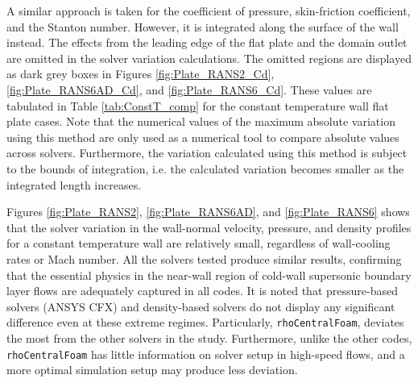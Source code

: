 \documentclass[journal ]{new-aiaa}
\begin{document}
A similar approach is taken for the coefficient of pressure, skin-friction coefficient, and the Stanton number. However, it is integrated along the surface of the wall instead. The effects from the leading edge of the flat plate and the domain outlet are omitted in the solver variation calculations. The omitted regions are displayed as dark grey boxes in Figures \ref{fig:Plate_RANS2_Cd},  \ref{fig:Plate_RANS6AD_Cd}, and \ref{fig:Plate_RANS6_Cd}. These values are tabulated in Table \ref{tab:ConstT_comp} for the constant temperature wall flat plate cases. Note that the numerical values of the maximum absolute variation using this method are only used as a numerical tool to compare absolute values across solvers. Furthermore, the variation calculated using this method is subject to the bounds of integration, i.e. the calculated variation becomes smaller as the integrated length increases. 


Figures \ref{fig:Plate_RANS2}, \ref{fig:Plate_RANS6AD}, and \ref{fig:Plate_RANS6} shows that the solver variation in the wall-normal velocity, pressure, and density profiles for a constant temperature wall are relatively small, regardless of wall-cooling rates or Mach number. All the solvers tested produce similar results, confirming that the essential physics in the near-wall region of cold-wall supersonic boundary layer flows are adequately captured in all codes. It is noted that pressure-based solvers (ANSYS CFX) and density-based solvers do not display any significant difference even at these extreme regimes. Particularly, \texttt{rhoCentralFoam}, deviates the most from the other solvers in the study. 
Furthermore, unlike the other codes, \texttt{rhoCentralFoam} has little information on solver setup in high-speed flows, and a more optimal simulation setup may produce less deviation. 
\end{document}
